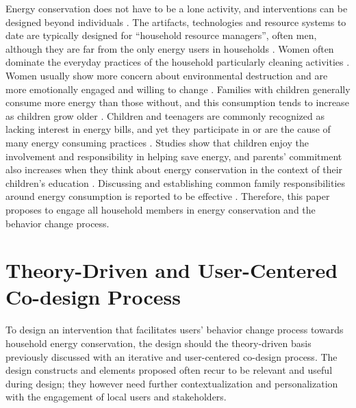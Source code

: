 \documentclass[a4paper,10pt]{article}
\begin{document}
Energy conservation does not have to be a lone activity, and interventions can be designed beyond individuals \citep{Petkov2011,Brynjarsdottir2012}. The artifacts, technologies and resource systems to date are typically designed for ``household resource managers'', often men, although they are far from the only energy users in households \citep{Strengers2014}. Women often dominate the everyday practices of the household particularly cleaning activities \citep{Strengers2011}. Women usually show more concern about environmental destruction and are more emotionally engaged and willing to change \citep{Kollmuss2002}. Families with children generally consume more energy than those without, and this consumption tends to increase as children grow older \citep{Fell2014}. Children and teenagers are commonly recognized as lacking interest in energy bills, and yet they participate in or are the cause of many energy consuming practices \citep{Berthou2013,Strengers2014}. Studies show that children enjoy the involvement and responsibility in helping save energy, and parents' commitment also increases when they think about energy conservation in the context of their children's education \citep{Burchell2014,Fell2014}. Discussing and establishing common family responsibilities around energy consumption is reported to be effective \citep{huizenga2015shedding}. Therefore, this paper proposes to engage all household members in energy conservation and the behavior change process. 

\section{Theory-Driven and User-Centered Co-design Process}
\label{sec:codesign}

To design an intervention that facilitates users' behavior change process towards household energy conservation, the design should the theory-driven basis previously discussed with an iterative and user-centered co-design process. The design constructs and elements proposed often recur to be relevant and useful during design; they however need further contextualization and personalization with the engagement of local users and stakeholders. 
\end{document}
